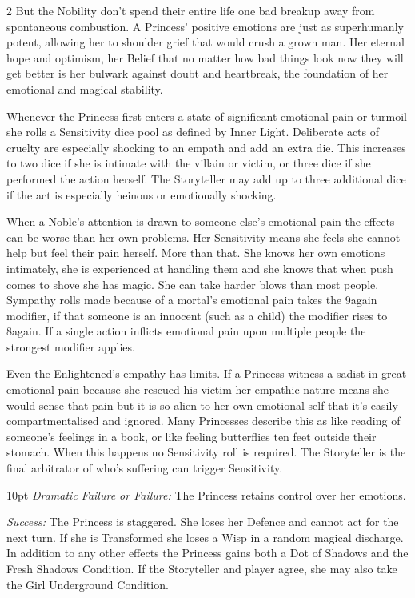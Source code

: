 \begin{multicols}{2}
But the Nobility don't spend their entire life one bad breakup away from spontaneous combustion. A Princess' positive emotions are just as superhumanly potent, allowing her to shoulder grief that would crush a grown man. Her eternal hope and optimism, her Belief that no matter how bad things look now they will get better is her bulwark against doubt and heartbreak, the foundation of her emotional and magical stability. 

Whenever the Princess first enters a state of significant emotional pain or turmoil she rolls a Sensitivity dice pool as defined by Inner Light. Deliberate acts of cruelty are especially shocking to an empath and add an extra die. This increases to two dice if she is intimate with the villain or victim, or three dice if she performed the action herself. The Storyteller may add up to three additional dice if the act is especially heinous or emotionally shocking. 

When a Noble's attention is drawn to someone else's emotional pain the effects can be worse than her own problems. Her Sensitivity means she feels she cannot help but feel their pain herself. More than that. She knows her own emotions intimately, she is experienced at handling them and she knows that when push comes to shove she has magic. She can take harder blows than most people. Sympathy rolls made because of a mortal's emotional pain takes the 9again modifier, if that someone is an innocent (such as a child) the modifier rises to 8again. If a single action inflicts emotional pain upon  multiple people the strongest modifier applies.

Even the Enlightened's empathy has limits. If a Princess witness a sadist in great emotional pain because she rescued his victim her empathic nature means she would sense that pain but it is so alien to her own emotional self that it's easily compartmentalised and ignored. Many Princesses describe this as like reading of someone's feelings in a book, or like feeling butterflies ten feet outside their stomach. When this happens no Sensitivity roll is required. The Storyteller is the final arbitrator of who's suffering can trigger Sensitivity. 

\begin{myindentpar}{10pt}    \emph{Dramatic Failure or Failure:} The Princess retains control over her emotions.

\emph{Success:} The Princess is staggered. She loses her Defence and cannot act for the next turn. If she is Transformed she loses a Wisp in a random magical discharge. In addition to any other effects the Princess gains both a Dot of Shadows and the Fresh Shadows Condition. If the Storyteller and player agree, she may also take the Girl Underground Condition. 


\end{myindentpar}
\end{multicols}
